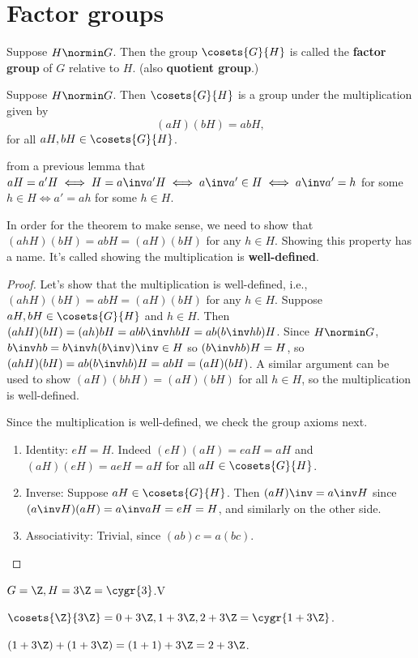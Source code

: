 \chapter{Factor groups}

\begin{definition}
	Suppose $H \normin G$. Then the group $\cosets{G}{H}$ is called the \textbf{factor group} of $G$ relative to $H$. (also \textbf{quotient group}.)
\end{definition}

\begin{theorem}
	Suppose $H \normin G$. Then $\cosets{G}{H}$ is a group under the multiplication given by \[(aH)(bH) = abH,\] for all $aH, bH \in \cosets{G}{H}$.
\end{theorem}

\begin{recall}
	from a previous lemma that $aH = a'H \iff H = a\inv a'H \iff a\inv a' \in H \iff a\inv a' = h$ for some $h \in H \iff a' = ah$ for some $h \in H$.
\end{recall}

In order for the theorem to make sense, we need to show that $(ahH)(bH) = abH = (aH)(bH)$ for any $h \in H$. Showing this property has a name. It's called showing the multiplication is \textbf{well-defined}.

\begin{proof}
	Let's show that the multiplication is well-defined, i.e., $(ahH)(bH) = abH = (aH)(bH)$ for any $h \in H$. Suppose $aH, bH \in \cosets{G}{H}$ and $h \in H$. Then $(ahH)(bH) = (ah)bH = abb\inv hbH = ab(b\inv h b)H$. Since $H \normin G$, $b\inv h b = b\inv h (b\inv)\inv \in H$ so $(b\inv h b)H = H$, so $(ahH)(bH) = ab(b\inv h b)H = abH = (aH)(bH)$. A similar argument can be used to show $(aH)(bhH) = (aH)(bH)$ for all $h \in H$, so the multiplication is well-defined.

	Since the multiplication is well-defined, we check the group axioms next.
	\begin{enumerate}
		\item Identity: $eH = H$. Indeed $(eH)(aH) = eaH = aH$ and $(aH)(eH) = aeH = aH$ for all $aH \in \cosets{G}{H}$.
		\item Inverse: Suppose $aH \in \cosets{G}{H}$. Then $(aH)\inv = a\inv H$ since $(a\inv H)(aH) = a\inv a H = eH = H$, and similarly on the other side.
		\item Associativity: Trivial, since $(ab)c = a(bc)$.
	\end{enumerate}
\end{proof}

\begin{example}
	$G = \Z, H=3\Z = \cygr{3}$.V

	$\cosets{\Z}{3\Z} = {0 + 3\Z, 1 + 3\Z, 2 + 3\Z} = \cygr{1 + 3\Z}$.

	$(1 + 3\Z) + (1 + 3\Z) = (1+1) + 3\Z = 2 + 3\Z$.
\end{example}
